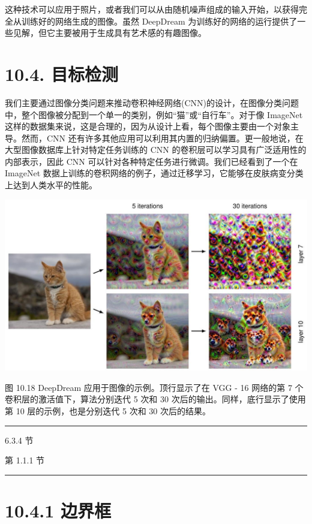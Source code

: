 \documentclass[10pt]{article}
\newcommand{\HRule}{\begin{center}\rule{0.9\linewidth}{0.2mm}\end{center}}
\begin{document}
这种技术可以应用于照片，或者我们可以从由随机噪声组成的输入开始，以获得完全从训练好的网络生成的图像。虽然 DeepDream 为训练好的网络的运行提供了一些见解，但它主要被用于生成具有艺术感的有趣图像。

\section*{10.4. 目标检测}

我们主要通过图像分类问题来推动卷积神经网络(CNN)的设计，在图像分类问题中，整个图像被分配到一个单一的类别，例如“猫”或“自行车”。对于像 ImageNet 这样的数据集来说，这是合理的，因为从设计上看，每个图像主要由一个对象主导。然而，CNN 还有许多其他应用可以利用其内置的归纳偏置。更一般地说，在大型图像数据库上针对特定任务训练的 CNN 的卷积层可以学习具有广泛适用性的内部表示，因此 CNN 可以针对各种特定任务进行微调。我们已经看到了一个在 ImageNet 数据上训练的卷积网络的例子，通过迁移学习，它能够在皮肤病变分类上达到人类水平的性能。

\begin{center}
\includegraphics[max width=1.0\textwidth]{images/0194e279-9b28-703a-88f4-c3ac21e2010d_328_247_351_1301_737_0.jpg}
\end{center}
\hspace*{3em} 

图 10.18 DeepDream 应用于图像的示例。顶行显示了在 VGG - 16 网络的第 7 个卷积层的激活值下，算法分别迭代 5 次和 30 次后的输出。同样，底行显示了使用第 10 层的示例，也是分别迭代 5 次和 30 次后的结果。

\HRule

6.3.4 节

第 1.1.1 节

\HRule

\section*{10.4.1 边界框}
\end{document}

